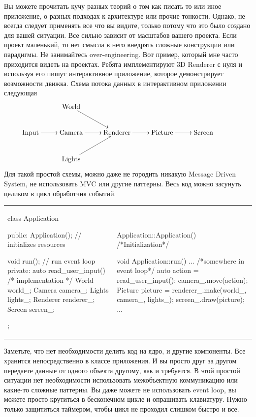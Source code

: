 Вы можете прочитать кучу разных теорий о том как писать то или иное приложение, о разных подходах к архитектуре или прочие тонкости.
Однако, не всегда следует применять все что вы видите, только потому что это было создано для вашей ситуации.
Все сильно зависит от масштабов вашего проекта.
Если проект маленький, то нет смысла в него внедрять сложные конструкции или парадигмы.
Не занимайтесь over-engineering.
Вот пример, который мне часто приходится видеть на проектах.
Ребята имплементируют 3D Renderer с нуля и используя его пишут интерактивное приложение, которое демонстрирует возможности движка.
Схема потока данных в интерактивном приложении следующая
\[
\xymatrix{
  {}&{\text{World}}\ar[dr]&{}&{}&{}&{}\\
  {\text{Input}}\ar[r]&{\text{Camera}}\ar[r]&{\text{Renderer}}\ar[r]&{\text{Picture}}\ar[r]&{\text{Screen}}&{}\\
  {}&{\text{Lights}}\ar[ur]&{}&{}&{}&{}\\
}
\]
Для такой простой схемы, можно даже не городить никакую Message Driven System, не использовать MVC или другие паттерны.
Весь код можно засунуть целиком в цикл обработчик событий.
\begin{center}
\begin{tabular}{ll}
{
\begin{minipage}[\baselineskip]{8cm}
\begin{cppcode}[numbers = none]
class Application {
public:
  Application(); // initializes resources
  
  void run(); // run event loop
private:
  auto read_user_input() {
    /* implementation */
  }
  World world_;
  Camera camera_;
  Lights lights_;
  Renderer renderer_;
  Screen screen_;
};
\end{cppcode}
\end{minipage}
}&{
\begin{minipage}[\baselineskip]{8cm}
\begin{cppcode}[numbers = none]
Application::Application() {
  /*Initialization*/
}

void Application::run() {
  ...
  /*somewhere in event loop*/
  auto action = read_user_input();
  camera_.move(action);
  Picture picture = renderer_.make(world_,
                                   camera_,
                                   lights_);
  screen_.draw(picture);
  ...
}
\end{cppcode}
\end{minipage}
}\\
\end{tabular}
\end{center}
Заметьте, что нет необходимости делить код на ядро, и другие компоненты.
Все хранится непосредственно в классе приложения.
И вы просто друг за другом передаете данные от одного объекта другому, как и требуется.
В этой простой ситуации нет необходимости использовать межобъектную коммуникацию или какие-то сложные паттерны.
Вы даже можете не использовать event loop, вы можете просто крутиться в бесконечном цикле и опрашивать клавиатуру.
Нужно только защититься таймером, чтобы цикл не проходил слишком быстро и все.

